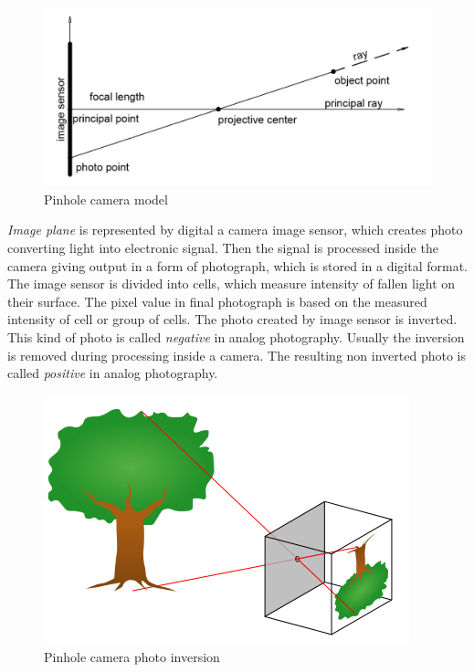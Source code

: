 \documentclass[a4paper,12pt]{article}
\newcommand{\term}[1]{
{\it #1}
}
\begin{document}
\begin{figure}[h]
    \centering
    \includegraphics[scale=0.3]{figures/pinhole_camera.png}
    \caption{Pinhole camera model}
\end{figure}



\term{Image plane} is represented by digital a camera image sensor, which  creates photo converting light into electronic signal.
Then the signal is processed inside the camera giving output in a form of photograph, which is stored in a digital format. 
The image sensor is divided into cells, which measure intensity of fallen light on their surface. The pixel value in final 
photograph is based on the measured intensity of cell or group of cells. The photo created by image sensor is inverted. This kind 
of photo is called \term{negative} in analog photography.  Usually the inversion is removed during processing inside a
camera. The resulting non inverted photo is called \term{positive} in analog photography. 

\begin{figure}[h]
    \centering
    \includegraphics[scale=0.4]{figures/pinhole_camera_inversion.png}
    \caption{Pinhole camera photo inversion \cite{mellish2005pinhole}}
\end{figure}
\end{document}
